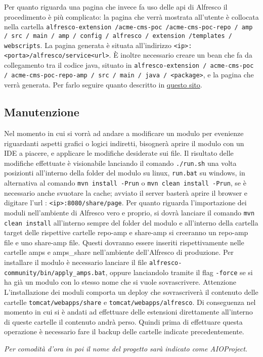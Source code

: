 Per quanto riguarda una pagina che invece fa uso delle api di Alfresco il procedimento è più complicato: la pagina che verrà mostrata all’utente è collocata nella cartella \texttt{alfresco-extension /acme-cms-poc /acme-cms-poc-repo / amp / src / main / amp / config / alfresco / extension /templates / webscripts}.
La pagina generata è situata all’indirizzo \texttt{<ip>:<porta>/alfresco/service<url>}.
È inoltre necessario creare un bean che fa da collegamento tra il codice java, situato in \texttt{alfresco-extension / acme-cms-poc / acme-cms-poc-repo-amp / src / main / java / <package>}, e la pagina che verrà generata. Per farlo seguire quanto descritto in \href{http://docs.alfresco.com/community/tasks/bean-config.html}{questo sito}.

\subsection{Manutenzione}
Nel momento in cui si vorrà ad andare a modificare un modulo per evenienze riguardanti aspetti grafici o logici indiretti, bisognerà aprire il modulo con un IDE a piacere, e applicare le modifiche desiderate sui file. Il risultato delle modifiche effettuate è visionabile lanciando il comando \texttt{./run.sh} una volta posizionti all’interno della folder del modulo su linux, \texttt{run.bat} su windows, in alternativa al comando \texttt{mvn install -Prun}  o  \texttt{mvn clean install -Prun}, se è necessario anche svuotare la cache; avviato il server basterà
aprire il browser e digitare l’url : \texttt{<ip>:8080/share/page}.
Per quanto riguarda l’importazione dei moduli nell'ambiente di Alfresco vero e proprio, si dovrà lanciare il comando \texttt{mvn clean install} all'interno sempre del folder del modulo e all’interno della cartella target delle rispettive cartelle repo-amp e share-amp si creeranno un repo-amp file e uno share-amp file. Questi dovranno essere inseriti rispettivamente nelle cartelle amps e amps\_share nell'ambiente dell'Alfresco di produzione.
Per installare il modulo  è necessario lanciare il file \texttt{alfresco-community/bin/apply\_amps.bat}, oppure lanciandolo tramite il flag \texttt{-force} se si ha già un modulo con lo stesso nome che si vuole sovrascrivere.
Attenzione
L’installazione dei moduli comporta un deploy che sovrascriverà il contenuto delle cartelle
\texttt{tomcat/webapps/share} e \texttt{tomcat/webapps/alfresco}. Di conseguenza nel momento in cui si è andati ad effettuare delle estensioni direttamente all’interno di queste cartelle il contenuto andrà perso. Quindi prima di effettuare questa operazione è necessario fare il backup delle cartelle indicate precedentemente.

\emph{Per comodità d’ora in poi il nome del progetto sarà indicato come AIOProject}.